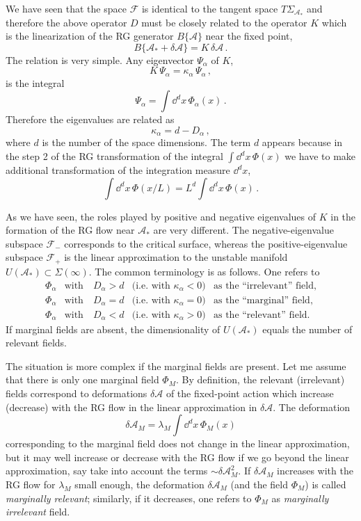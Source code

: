 We have seen that the space $\mathcal F$ is identical to the tangent space
$T\Sigma_{\mathcal A_*}$ and therefore the above operator $D$ must be closely
related to the operator $K$ which is the linearization of the RG generator
$B\{\mathcal A\}$ near the fixed point,
\begin{equation}\label{eq:BK}
B\{\mathcal A_*+\delta\mathcal A\}=K\,\delta\mathcal A\,.
\end{equation}
The relation is very simple. Any eigenvector $\Psi_\alpha$ of $K$,
\[
K\,\Psi_\alpha=\kappa_\alpha\,\Psi_\alpha\,,
\]
is the integral
\[
\Psi_\alpha=\int \dd^dx\,\Phi_\alpha(x)\,.
\]
Therefore the eigenvalues are related as
\[
\kappa_\alpha=d-D_\alpha\,,
\]
where $d$ is the number of the space dimensions. The term $d$ appears because in
the step 2 of the RG transformation of the integral $\int \dd^dx\,\Phi(x)$ we have to
make additional transformation of the integration measure $\dd^dx$,
\[
\int \dd^dx\,\Phi(x/L)=L^d\int \dd^dx\,\Phi(x)\,.
\]

As we have seen, the roles played by positive and negative eigenvalues of $K$ in
the formation of the RG flow near $\mathcal A_*$ are very different. The
negative-eigenvalue subspace $\mathcal F_-$ corresponds to the critical surface,
whereas the positive-eigenvalue subspace $\mathcal F_+$ is the linear
approximation to the unstable manifold $U(\mathcal A_*)\subset\Sigma(\infty)$. The
common terminology is as follows. One refers to
\[
\begin{array}{llll}
\Phi_\alpha & \text{with}\quad D_\alpha>d & \text{(i.e.\ with }\kappa_\alpha<0) & \text{as the ``irrelevant'' field,}\\
\Phi_\alpha & \text{with}\quad D_\alpha=d & \text{(i.e.\ with }\kappa_\alpha=0) & \text{as the ``marginal'' field,}\\
\Phi_\alpha & \text{with}\quad D_\alpha<d & \text{(i.e.\ with }\kappa_\alpha>0) & \text{as the ``relevant'' field.}
\end{array}
\]
If marginal fields are absent, the dimensionality of $U(\mathcal A_*)$ equals the
number of relevant fields.

The situation is more complex if the marginal fields are present. Let me assume
that there is only one marginal field $\Phi_M$. By definition, the relevant
(irrelevant) fields correspond to deformations $\delta\mathcal A$ of the
fixed-point action which increase (decrease) with the RG flow in the linear
approximation in $\delta\mathcal A$. The deformation
\[
\delta\mathcal A_M=\lambda_M\int \dd^dx\,\Phi_M(x)
\]
corresponding to the marginal field does not change in the linear approximation,
but it may well increase or decrease with the RG flow if we go beyond the linear
approximation, say take into account the terms $\sim\delta\mathcal A_M^2$. If
$\delta\mathcal A_M$ increases with the RG flow for $\lambda_M$ small enough, the
deformation $\delta\mathcal A_M$ (and the field $\Phi_M$) is called
\emph{marginally relevant}; similarly, if it decreases, one refers to $\Phi_M$ as
\emph{marginally irrelevant} field.

